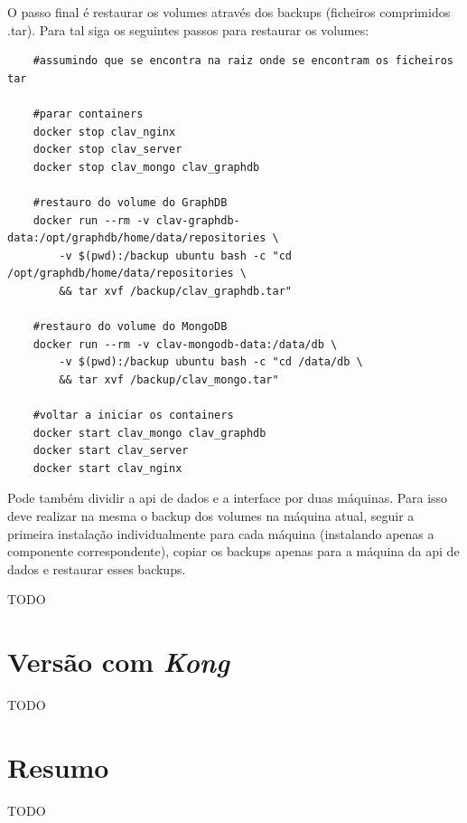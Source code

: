 O passo final é restaurar os volumes através dos backups (ficheiros comprimidos .tar). Para tal siga os seguintes passos para restaurar os volumes:
\begin{verbatim}
    #assumindo que se encontra na raiz onde se encontram os ficheiros tar

    #parar containers
    docker stop clav_nginx
    docker stop clav_server
    docker stop clav_mongo clav_graphdb
    
    #restauro do volume do GraphDB
    docker run --rm -v clav-graphdb-data:/opt/graphdb/home/data/repositories \
        -v $(pwd):/backup ubuntu bash -c "cd /opt/graphdb/home/data/repositories \
        && tar xvf /backup/clav_graphdb.tar"
        
    #restauro do volume do MongoDB
    docker run --rm -v clav-mongodb-data:/data/db \
        -v $(pwd):/backup ubuntu bash -c "cd /data/db \
        && tar xvf /backup/clav_mongo.tar"
        
    #voltar a iniciar os containers
    docker start clav_mongo clav_graphdb
    docker start clav_server
    docker start clav_nginx
\end{verbatim}

Pode também dividir a \acrshort{api} de dados e a interface por duas máquinas. Para isso deve realizar na mesma o backup dos volumes na máquina atual, seguir a primeira instalação individualmente para cada máquina (instalando apenas a componente correspondente), copiar os backups apenas para a máquina da \acrshort{api} de dados e restaurar esses backups.

TODO

\section{Versão com \textit{Kong}}

TODO

\section{Resumo}

TODO

